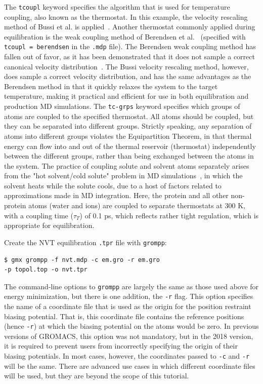 \documentclass[9pt,tutorial]{livecoms}
\begin{document}
The \texttt{tcoupl} keyword specifies the algorithm that is used for temperature coupling, also known as the thermostat. In this example, the velocity rescaling method of Bussi et al. is applied~\cite{Bussi2007}. Another thermostat commonly applied during equilibration is the weak coupling method of Berendsen et al.~\cite{Berendsen1984} (specified with \texttt{tcoupl = berendsen} in the \texttt{.mdp} file). The Berendsen weak coupling method has fallen out of favor, as it has been demonstrated that it does not sample a correct canonical velocity distribution~\cite{Bussi2007}. The Bussi velocity rescaling method, however, does sample a correct velocity distribution, and has the same advantages as the Berendsen method in that it quickly relaxes the system to the target temperature, making it practical and efficient for use in both equilibration and production MD simulations. The \texttt{tc-grps} keyword specifies which groups of atoms are coupled to the specified thermostat. All atoms should be coupled, but they can be separated into different groups. Strictly speaking, any separation of atoms into different groups violates the Equipartition Theorem, in that thermal energy can flow into and out of the thermal reservoir (thermostat) independently between the different groups, rather than being exchanged between the atoms in the system. The practice of coupling solute and solvent atoms separately arises from the "hot solvent/cold solute" problem in MD simulations~\cite{Lingenheil2008}, in which the solvent heats while the solute cools, due to a host of factors related to approximations made in MD integration. Here, the protein and all other non-protein atoms (water and ions) are coupled to separate thermostats at 300 K, with a coupling time ($\tau_{T}$) of 0.1 ps, which reflects rather tight regulation, which is appropriate for equilibration.

Create the NVT equilibration \texttt{.tpr} file with \texttt{grompp}:

\begin{verbatim}
$ gmx grompp -f nvt.mdp -c em.gro -r em.gro 
-p topol.top -o nvt.tpr
\end{verbatim}

The command-line options to \texttt{grompp} are largely the same as those used above for energy minimization, but there is one addition, the \texttt{-r} flag. This option specifies the name of a coordinate file that is used as the origin for the position restraint biasing potential. That is, this coordinate file contains the reference positions (hence \texttt{-r}) at which the biasing potential on the atoms would be zero. In previous versions of GROMACS, this option was not mandatory, but in the 2018 version, it is required to prevent users from incorrectly specifying the origin of their biasing potentials. In most cases, however, the coordinates passed to \texttt{-c} and \texttt{-r} will be the same. There are advanced use cases in which different coordinate files will be used, but they are beyond the scope of this tutorial.
\end{document}
